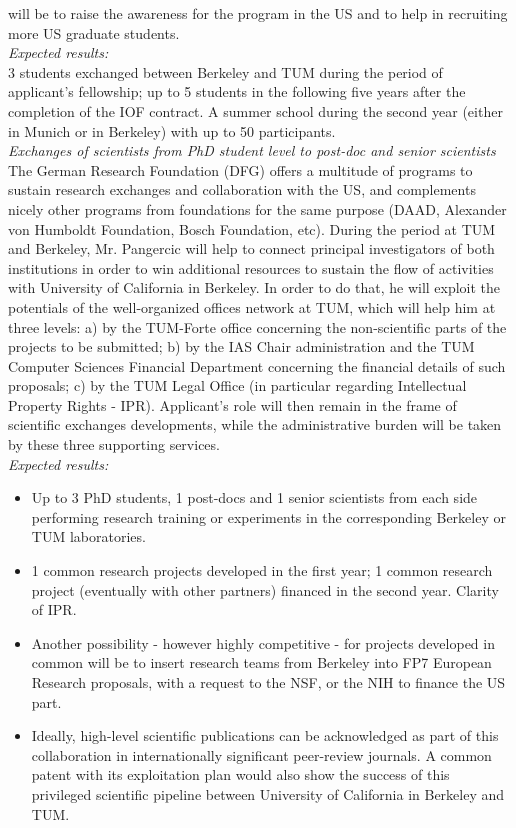 will be to raise  the awareness for the program in the  US and to help
in recruiting more US graduate students.\\
\emph{Expected results:}\\
 3 students exchanged between Berkeley and TUM during
the period of  applicant's fellowship; up to 5 students  in the following five
years after the completion of the IOF contract. A summer school during
the  second year  (either in  Munich or  in Berkeley)  with up  to 50
participants. \\  
\emph{Exchanges of  scientists from  PhD student  level to
post-doc and  senior scientists}\\
 The German Research  Foundation (DFG) offers  a multitude  of  programs to  sustain  research exchanges  and
collaboration with the US,  and complements nicely other programs from
foundations  for  the  same  purpose  (DAAD,  Alexander  von  Humboldt
Foundation, Bosch Foundation, etc). During  the period at TUM and Berkeley, 
Mr. Pangercic will help to connect principal  investigators of both institutions in order
to win  additional resources  to sustain the  flow of  activities with
University  of California in  Berkeley. In  order to  do that,  he will
exploit the  potentials of  the well-organized offices  network at
TUM, which  will help him at  three levels: a) by  the TUM-Forte office
concerning the  non-scientific parts of the projects  to be submitted;
b)  by the  IAS Chair  administration and  the TUM  Computer Sciences
Financial  Department   concerning  the  financial   details  of  such
proposals;  c)  by  the  TUM  Legal Office  (in  particular  regarding
Intellectual Property Rights  - IPR). Applicant's role will  then remain in the
frame of  scientific exchanges developments,  while the administrative
burden  will be taken  by these  three supporting  services.\\
\emph{Expected results:}\\
\begin{itemize}
\item Up  to 3  PhD students, 1  post-docs and 1  senior scientists
from  each side  performing research  training or  experiments  in the
corresponding   Berkeley   or   TUM laboratories.  
\item 1 common research projects developed in the first year;
1 common research project (eventually with other partners) financed in
the second year. Clarity of IPR.  
\item Another possibility - however highly competitive  - for  projects developed
in  common will  be to  insert research  teams from  Berkeley  into FP7
European Research proposals, with a request  to the NSF, or the NIH to
finance the US part.   
\item Ideally, high-level scientific publications can
be  acknowledged  as part  of  this  collaboration in  internationally
significant   peer-review   journals.  A   common   patent  with   its
exploitation  plan would  also  show the  success  of this  privileged
scientific pipeline  between University of California  in Berkeley and
TUM.
\end{itemize}
